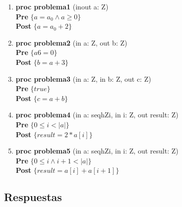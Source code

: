 \documentclass{article}
\begin{document}
\begin{enumerate}[label=\alph*)]
\item \textbf{proc problema1 }(inout a: Z) {\\
   \hspace*{6mm} \textbf{Pre }$\{a = a_0 \wedge a \geq 0\}$\\
   \hspace*{6mm} \textbf{Post }$\{a = a_0 + 2\}$\\
   }

\item \textbf{proc problema2 }(in a: Z, out b: Z) {\\
   \hspace*{6mm} \textbf{Pre }$\{a 6= 0\}$\\
   \hspace*{6mm} \textbf{Post }$\{b = a + 3\}$\\
   }

\item \textbf{proc problema3 }(in a: Z, in b: Z, out c: Z) {\\
   \hspace*{6mm} \textbf{Pre }$\{true\}$\\
   \hspace*{6mm} \textbf{Post }$\{c = a + b\}$\\
   }

\item \textbf{proc problema4 }(in a: seqhZi, in i: Z, out result: Z) {\\
   \hspace*{6mm} \textbf{Pre }$\{0 \leq i < |a|\}$\\
   \hspace*{6mm} \textbf{Post }$\{result = 2 * a[i]\}$\\
   }

\item \textbf{proc problema5 }(in a: seqhZi, in i: Z, out result: Z) {\\
   \hspace*{6mm} \textbf{Pre }$\{0 \leq i \wedge i + 1 < |a|\}$\\
   \hspace*{6mm} \textbf{Post }$\{result = a[i] + a[i + 1]\}$\\
   }
\end{enumerate}

\subsection*{Respuestas}
\end{document}
